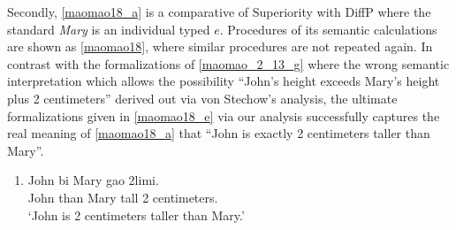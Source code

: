 \documentclass{ctexart}
\begin{document}
Secondly, \ref{maomao18_a} is a comparative of Superiority with DiffP where the standard \textit{Mary} is an individual typed $e$. Procedures of its semantic calculations are shown as \ref{maomao18}, where similar procedures are not repeated again. In contrast with the formalizations of \ref{maomao_2_13_g} where the wrong semantic interpretation which allows the possibility ``John's height exceeds Mary's height plus 2 centimeters'' derived out via von Stechow's analysis, the ultimate formalizations given in \ref{maomao18_e} via our analysis successfully captures the real meaning of \ref{maomao18_a} that ``John is exactly 2 centimeters taller than Mary''.

\begin{enumerate}
    \item \label{maomao18_a}
    John bi \enspace \enspace Mary gao \enspace \enspace 2limi. \\
    John than Mary tall 2 centimeters. \\
    `John is 2 centimeters taller than Mary.'
\end{enumerate}
\end{document}
